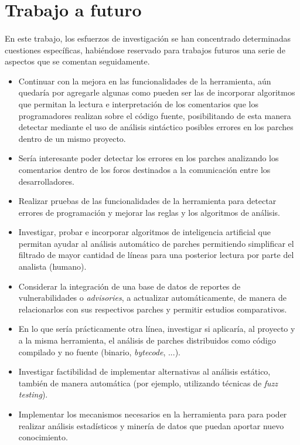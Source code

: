 \documentclass[11pt,a4paper]{article}
\begin{document}
\section{Trabajo a futuro}

\paragraph{}En este trabajo, los esfuerzos de investigación se han concentrado determinadas cuestiones específicas, habiéndose reservado para trabajos futuros una serie de aspectos que se comentan seguidamente.

\begin{itemize}
\item Continuar con la mejora en las funcionalidades de la herramienta, aún quedaría por agregarle algunas como pueden ser las de incorporar algoritmos que permitan la lectura e interpretación de los comentarios que los programadores realizan sobre el código fuente, posibilitando de esta manera detectar mediante el uso de análisis sintáctico posibles errores en los parches dentro de un mismo proyecto.

\item Sería interesante poder detectar los errores en los parches analizando los comentarios dentro de los foros destinados a la comunicación entre los desarrolladores.

\item Realizar pruebas de las funcionalidades de la herramienta para detectar errores de programación y mejorar las reglas y los algoritmos de análisis.

\item Investigar, probar e incorporar algoritmos de inteligencia artificial que permitan ayudar al análisis automático de parches permitiendo simplificar el filtrado de mayor cantidad de líneas para una posterior lectura por parte del analista (humano).

\item Considerar la integración de una base de datos de reportes de vulnerabilidades o \textit{advisories}, a actualizar automáticamente, de manera de relacionarlos con sus respectivos parches y permitir estudios comparativos.

\item En lo que sería prácticamente otra línea, investigar si aplicaría, al proyecto y a la misma herramienta, el análisis de parches distribuidos como código compilado y no fuente (binario, \textit{bytecode}, ...).

\item Investigar factibilidad de implementar alternativas al análisis estático, también de manera automática (por ejemplo, utilizando técnicas de \textit{fuzz testing}).

\item Implementar los mecanismos necesarios en la herramienta para para poder realizar análisis estadísticos y minería de datos que puedan aportar nuevo conocimiento.

\end{itemize}
\end{document}
